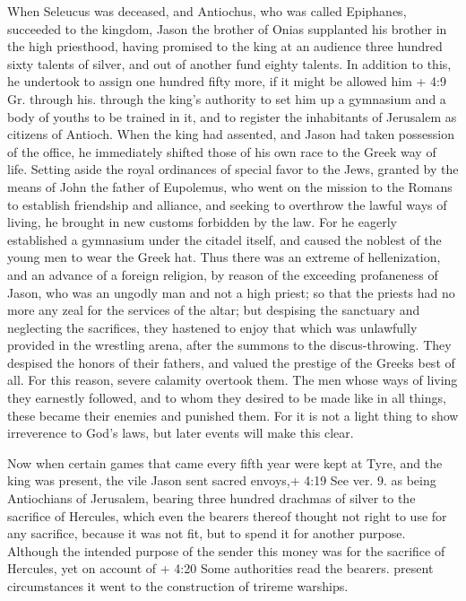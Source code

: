  When Seleucus was deceased, and Antiochus, who was called
Epiphanes, succeeded to the kingdom, Jason the brother of Onias
supplanted his brother in the high priesthood,  having
promised to the king at an audience three hundred sixty talents of
silver, and out of another fund eighty talents.  In addition
to this, he undertook to assign one hundred fifty more, if it might be
allowed him + 4:9 Gr. through his. through the king's authority to set
him up a gymnasium and a body of youths to be trained in it, and to
register the inhabitants of Jerusalem as citizens of Antioch.
 When the king had assented, and Jason had taken possession
of the office, he immediately shifted those of his own race to the Greek
way of life.  Setting aside the royal ordinances of special
favor to the Jews, granted by the means of John the father of Eupolemus,
who went on the mission to the Romans to establish friendship and
alliance, and seeking to overthrow the lawful ways of living, he brought
in new customs forbidden by the law.  For he eagerly
established a gymnasium under the citadel itself, and caused the noblest
of the young men to wear the Greek hat.  Thus there was an
extreme of hellenization, and an advance of a foreign religion, by
reason of the exceeding profaneness of Jason, who was an ungodly man and
not a high priest;  so that the priests had no more any
zeal for the services of the altar; but despising the sanctuary and
neglecting the sacrifices, they hastened to enjoy that which was
unlawfully provided in the wrestling arena, after the summons to the
discus-throwing.  They despised the honors of their
fathers, and valued the prestige of the Greeks best of all.
 For this reason, severe calamity overtook them. The men
whose ways of living they earnestly followed, and to whom they desired
to be made like in all things, these became their enemies and punished
them.  For it is not a light thing to show irreverence to
God's laws, but later events will make this clear.

 Now when certain games that came every fifth year were
kept at Tyre, and the king was present,  the vile Jason
sent sacred envoys,+ 4:19 See ver. 9. as being Antiochians of Jerusalem,
bearing three hundred drachmas of silver to the sacrifice of Hercules,
which even the bearers thereof thought not right to use for any
sacrifice, because it was not fit, but to spend it for another purpose.
 Although the intended purpose of the sender this money was
for the sacrifice of Hercules, yet on account of + 4:20 Some authorities
read the bearers. present circumstances it went to the construction of
trireme warships.

